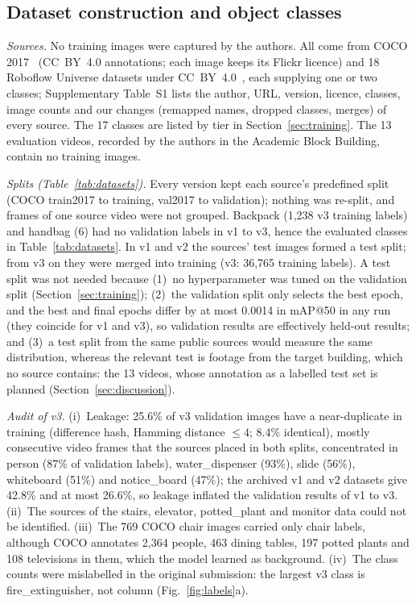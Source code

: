 \documentclass[3p,times,procedia]{elsarticle}
\DeclareRobustCommand{\rev}[1]{{\hlattr=1 #1}}
\DeclareRobustCommand{\rev}[1]{\hl{#1}}
\DeclareRobustCommand{\rev}[1]{#1}
\begin{document}
\subsection{Dataset construction and object classes}
\label{sec:dataset}

\emph{Sources.} \rev{No training images were captured by the authors.} All come
from COCO 2017~\cite{lin2014coco} (CC~BY~4.0 annotations; each image keeps
its Flickr licence) and 18 Roboflow Universe datasets under
CC~BY~4.0~\cite{rf_person,rf_chair,rf_door,rf_navigation,rf_whiteboard,rf_notice,rf_elevatordoor,rf_column,rf_window,rf_water,rf_plant,rf_wastebin,rf_dustbin,rf_trashbin,rf_fire,rf_wetfloor,rf_table,rf_monitor},
\rev{each supplying one or two classes;} \rev{Supplementary Table~S1 lists the author,
URL, version, licence, classes, image counts and our changes} (remapped
names, dropped classes, merges) of every source. The 17 classes are listed
by tier in Section~\ref{sec:training}. \rev{The 13 evaluation videos, recorded by
the authors in the Academic Block Building, contain no training images.}

\emph{Splits (Table~\ref{tab:datasets}).} \rev{Every version kept each source's
predefined split (COCO train2017 to training, val2017 to validation)};
\rev{nothing was re-split, and frames of one source video were not grouped.}
\rev{Backpack (1,238 v3 training labels) and handbag (6) had no validation labels
in v1 to v3}, hence the evaluated classes in Table~\ref{tab:datasets}. In v1
and v2 the sources' test images formed a test split; \rev{from v3 on they were
merged into training} (v3: 36,765 training labels). \rev{A test split was not
needed because (1)~no hyperparameter was tuned on the validation split}
(Section~\ref{sec:training}); (2)~the validation split only selects the best
epoch, and the best and final epochs differ by at most 0.0014 in mAP@50 in
any run (they coincide for v1 and v3), so validation results are effectively
held-out results; and (3)~a test split from the same public sources would
measure the same distribution, whereas the relevant test is footage from the
target building, which no source contains: the 13 videos, whose annotation
as a labelled test set is planned (Section~\ref{sec:discussion}).

\emph{Audit of v3.} \rev{(i)~Leakage: 25.6\% of v3 validation images have a
near-duplicate in training} (difference hash, Hamming distance $\leq 4$;
8.4\% identical), mostly consecutive video frames that the sources placed in
both splits, concentrated in person (87\% of validation labels),
water\_dispenser (93\%), slide (56\%), whiteboard (51\%) and notice\_board
(47\%); the archived v1 and v2 datasets give 42.8\% and at most 26.6\%, so
leakage inflated the validation results of v1 to v3. (ii)~The sources of
the stairs, elevator, potted\_plant and monitor data could not be
identified. (iii)~The 769 COCO chair images carried only chair labels,
although COCO annotates 2,364 people, 463 dining tables, 197 potted plants
and 108 televisions in them, which the model learned as background.
\rev{(iv)~The class counts were mislabelled in the original submission: the
largest v3 class is fire\_extinguisher, not column} (Fig.~\ref{fig:labels}a).
\end{document}
